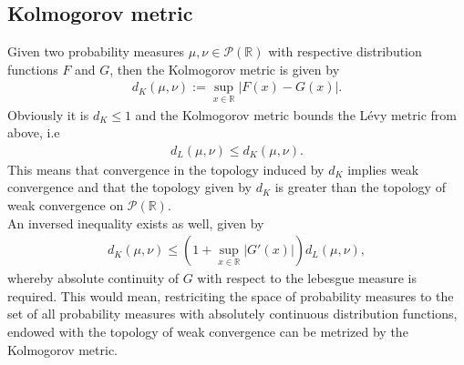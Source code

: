 \documentclass[11pt,a4paper]{article}
\begin{document}
\subsection*{Kolmogorov metric}
Given two probability measures $\mu,\nu\in\mathcal{P}(\mathbb{R})$ with respective distribution functions $F$ and $G$, then the Kolmogorov metric is given by
\begin{align*}
d_K(\mu,\nu):=\sup\limits_{x\in\mathbb{R}}|F(x)-G(x)|.
\end{align*}
Obviously it is $d_K\leq{}1$ and the Kolmogorov metric bounds the Lévy metric from above, i.e
\begin{align*}
d_L(\mu,\nu) \leq d_K(\mu,\nu).
\end{align*}
This means that convergence in the topology induced by $d_K$ implies weak convergence and that the topology given by $d_K$ is greater than the topology of weak convergence on $\mathcal{P}(\mathbb{R})$.\vspace{1em}\\
An inversed inequality exists as well, given by
\begin{align*}
d_K(\mu,\nu) \leq \left(1+\sup\limits_{x\in\mathbb{R}}|G'(x)|\right)d_L(\mu,\nu), 
\end{align*}
whereby absolute continuity of $G$ with respect to the lebesgue measure is required. This would mean, restriciting the space of probability measures to the set of all probability measures with absolutely continuous distribution functions, endowed with the topology of weak convergence can be metrized by the Kolmogorov metric.
\end{document}
